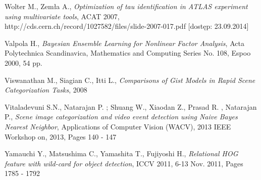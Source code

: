 \begin{thebibliography}{100}
 Wolter M., Zemła A., \emph{Optimization of tau identification in ATLAS experiment using multivariate tools}, ACAT 2007, http://cds.cern.ch/record/1027582/files/slide-2007-017.pdf [dostęp: 23.09.2014]

 Valpola H., \emph{Bayesian Ensemble Learning for Nonlinear Factor Analysis}, Acta Polytechnica Scandinavica, Mathematics and Computing Series No. 108, Espoo 2000, 54 pp.

  Viswanathan M., Siagian C., Itti L., \emph{Comparisons of Gist Models in Rapid Scene Categorization Tasks}, 2008

 Vitaladevuni S.N., Natarajan P. ; Shuang W., Xiaodan Z., Prasad R. , Natarajan P., \emph{Scene image categorization and video event detection using Naive Bayes Nearest Neighbor}, Applications of Computer Vision (WACV), 2013 IEEE Workshop on, 2013, Pages 140 - 147

 Yamauchi Y., Matsushima C., Yamashita T., Fujiyoshi H., \emph{Relational HOG feature with wild-card for object detection}, ICCV 2011, 6-13 Nov. 2011, Pages 1785 - 1792
 
\end{thebibliography} 